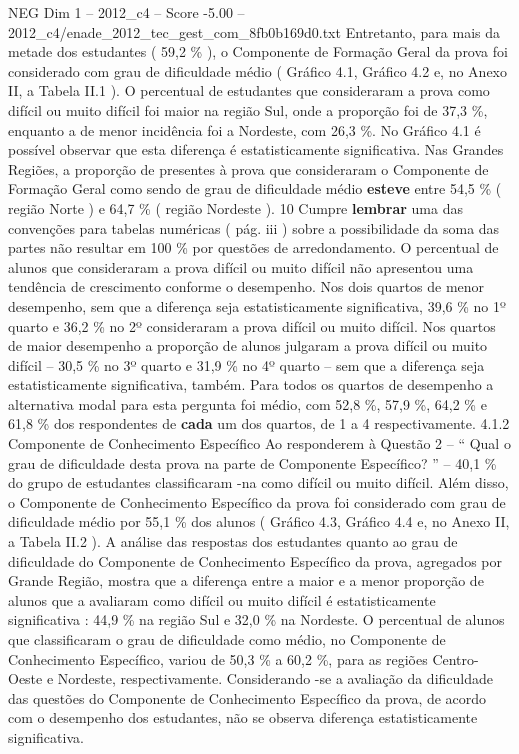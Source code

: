\begin{textsample}{NEG Dim 1 – 2012\_c4 – Score -5.00 – 2012\_c4/enade\_2012\_tec\_gest\_com\_8fb0b169d0.txt}
Entretanto, para mais da metade dos estudantes ( 59,2 \% ), o Componente de Formação Geral da prova foi considerado com grau de dificuldade médio ( Gráfico 4.1, Gráfico 4.2 e, no Anexo II, a Tabela II.1 ).
O percentual de estudantes que consideraram a prova como difícil ou muito difícil foi maior na região Sul, onde a proporção foi de 37,3 \%, enquanto a de menor incidência foi a Nordeste, com 26,3 \%.
No Gráfico 4.1 é possível observar que esta diferença é estatisticamente significativa.
Nas Grandes Regiões, a proporção de presentes à prova que consideraram o Componente de Formação Geral como sendo de grau de dificuldade médio \textbf{esteve} entre 54,5 \% ( região Norte ) e 64,7 \% ( região Nordeste ). 10 Cumpre \textbf{lembrar} uma das convenções para tabelas numéricas ( pág. iii ) sobre a possibilidade da soma das partes não resultar em 100 \% por questões de arredondamento.
O percentual de alunos que consideraram a prova difícil ou muito difícil não apresentou uma tendência de crescimento conforme o desempenho.
Nos dois quartos de menor desempenho, sem que a diferença seja estatisticamente significativa, 39,6 \% no 1º quarto e 36,2 \% no 2º consideraram a prova difícil ou muito difícil.
Nos quartos de maior desempenho a proporção de alunos julgaram a prova difícil ou muito difícil – 30,5 \% no 3º quarto e 31,9 \% no 4º quarto – sem que a diferença seja estatisticamente significativa, também.
Para todos os quartos de desempenho a alternativa modal para esta pergunta foi médio, com 52,8 \%, 57,9 \%, 64,2 \% e 61,8 \% dos respondentes de \textbf{cada} um dos quartos, de 1 a 4 respectivamente. 4.1.2 Componente de Conhecimento Específico Ao responderem à Questão 2 – “ Qual o grau de dificuldade desta prova na parte de Componente Específico? ” – 40,1 \% do grupo de estudantes classificaram -na como difícil ou muito difícil.
Além disso, o Componente de Conhecimento Específico da prova foi considerado com grau de dificuldade médio por 55,1 \% dos alunos ( Gráfico 4.3, Gráfico 4.4 e, no Anexo II, a Tabela II.2 ).
A análise das respostas dos estudantes quanto ao grau de dificuldade do Componente de Conhecimento Específico da prova, agregados por Grande Região, mostra que a diferença entre a maior e a menor proporção de alunos que a avaliaram como difícil ou muito difícil é estatisticamente significativa : 44,9 \% na região Sul e 32,0 \% na Nordeste.
O percentual de alunos que classificaram o grau de dificuldade como médio, no Componente de Conhecimento Específico, variou de 50,3 \% a 60,2 \%, para as regiões Centro-Oeste e Nordeste, respectivamente.
Considerando -se a avaliação da dificuldade das questões do Componente de Conhecimento Específico da prova, de acordo com o desempenho dos estudantes, não se observa diferença estatisticamente significativa.

\end{textsample}
